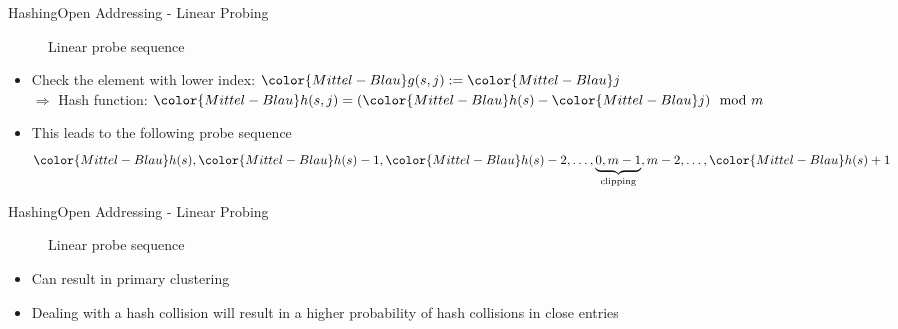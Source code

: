\begin{frame}{Hashing}{Open Addressing - Linear Probing}
  \begin{figure}[!h]
    \begin{adjustbox}{width=0.75\linewidth}%
    \end{adjustbox}
    \vspace{-1.0em}
    \caption{Linear probe sequence}%
    \label{fig:hashing:open_addressing:linear_probing}%
  \end{figure}
  \vspace{-1.0em}
  \begin{itemize}
    \item<2->
      Check the element with lower index:
      \begin{math}
        {\color{Mittel-Blau}g(s,j)} := {\color{Mittel-Blau}j}
      \end{math}\\
      $\Rightarrow$ Hash function:
      \begin{math}
        {\color{Mittel-Blau}h(s,j)}
        = ({\color{Mittel-Blau}h(s)} - {\color{Mittel-Blau}j}) \mod m
      \end{math}
    \item<3->
      This leads to the following probe sequence
      \begin{displaymath}
        {\color{Mittel-Blau}h(s)},
        {\color{Mittel-Blau}h(s)}-1,
        {\color{Mittel-Blau}h(s)}-2,
        \dots,
        \underbrace{0, m-1}_\text{clipping},
        m-2,
        \dots,
        {\color{Mittel-Blau}h(s)}+1
      \end{displaymath}
  \end{itemize}
\end{frame}


\begin{frame}{Hashing}{Open Addressing - Linear Probing}
  \begin{figure}[!h]
    \begin{adjustbox}{width=0.75\linewidth}%
    \end{adjustbox}
    \vspace{-0.5em}
    \caption{Linear probe sequence}%
    \label{fig:hashing:open_addressing:linear_probing2}%
  \end{figure}
  \vspace{-1.5em}
  \begin{itemize}
    \item<2->
      Can result in primary clustering
    \item<3->
      Dealing with a hash collision will result in a higher probability of hash
      collisions in close entries
  \end{itemize}
\end{frame}

